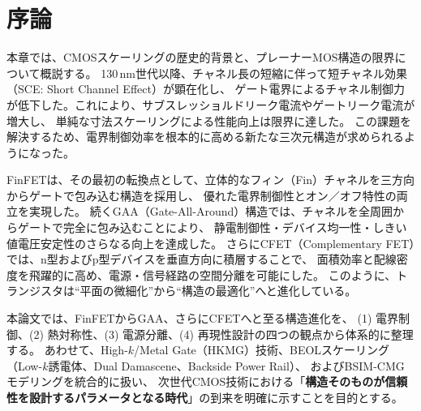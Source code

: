 \section{序論}
本章では、CMOSスケーリングの歴史的背景と、プレーナーMOS構造の限界について概説する。  
130\,nm世代以降、チャネル長の短縮に伴って短チャネル効果（SCE: Short Channel Effect）が顕在化し、  
ゲート電界によるチャネル制御力が低下した。これにより、サブスレッショルドリーク電流やゲートリーク電流が増大し、  
単純な寸法スケーリングによる性能向上は限界に達した。  
この課題を解決するため、電界制御効率を根本的に高める新たな三次元構造が求められるようになった。

FinFETは、その最初の転換点として、立体的なフィン（Fin）チャネルを三方向からゲートで包み込む構造を採用し、  
優れた電界制御性とオン／オフ特性の両立を実現した。  
続くGAA（Gate-All-Around）構造では、チャネルを全周囲からゲートで完全に包み込むことにより、  
静電制御性・デバイス均一性・しきい値電圧安定性のさらなる向上を達成した。  
さらにCFET（Complementary FET）では、n型およびp型デバイスを垂直方向に積層することで、  
面積効率と配線密度を飛躍的に高め、電源・信号経路の空間分離を可能にした。  
このように、トランジスタは“平面の微細化”から“構造の最適化”へと進化している。

本論文では、FinFETからGAA、さらにCFETへと至る構造進化を、  
(1) 電界制御、(2) 熱対称性、(3) 電源分離、(4) 再現性設計の四つの観点から体系的に整理する。  
あわせて、High-$k$/Metal Gate（HKMG）技術、BEOLスケーリング（Low-$k$誘電体、Dual Damascene、Backside Power Rail）、  
およびBSIM-CMGモデリングを統合的に扱い、  
次世代CMOS技術における「\textbf{構造そのものが信頼性を設計するパラメータとなる時代}」の到来を明確に示すことを目的とする。
